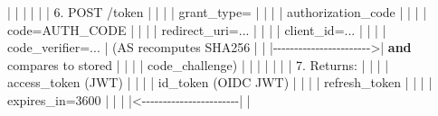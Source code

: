 \documentclass[11pt]{article}
\newenvironment{Shaded}{\begin{snugshade}}{\end{snugshade}}
\newcommand{\DecValTok}[1]{\textcolor[rgb]{0.96,0.45,0.00}{#1}}
\newcommand{\FloatTok}[1]{\textcolor[rgb]{0.96,0.45,0.00}{#1}}
\newcommand{\KeywordTok}[1]{\textcolor[rgb]{0.81,0.81,0.76}{\textbf{#1}}}
\newcommand{\NormalTok}[1]{\textcolor[rgb]{0.81,0.81,0.76}{#1}}
\newcommand{\OperatorTok}[1]{\textcolor[rgb]{0.81,0.81,0.76}{#1}}
\begin{document}
\begin{Shaded}
\begin{Highlighting}[]
  \OperatorTok{|}                \OperatorTok{|}                        \OperatorTok{|}                          \OperatorTok{|}
  \OperatorTok{|}                \OperatorTok{|} \FloatTok{6.}\NormalTok{ POST }\OperatorTok{/}\NormalTok{token         }\OperatorTok{|}                          \OperatorTok{|}
  \OperatorTok{|}                \OperatorTok{|}\NormalTok{    grant\_type}\OperatorTok{=}         \OperatorTok{|}                          \OperatorTok{|}
  \OperatorTok{|}                \OperatorTok{|}\NormalTok{    authorization\_code  }\OperatorTok{|}                          \OperatorTok{|}
  \OperatorTok{|}                \OperatorTok{|}\NormalTok{    code}\OperatorTok{=}\NormalTok{AUTH\_CODE      }\OperatorTok{|}                          \OperatorTok{|}
  \OperatorTok{|}                \OperatorTok{|}\NormalTok{    redirect\_uri}\OperatorTok{=}\NormalTok{...    }\OperatorTok{|}                          \OperatorTok{|}
  \OperatorTok{|}                \OperatorTok{|}\NormalTok{    client\_id}\OperatorTok{=}\NormalTok{...       }\OperatorTok{|}                          \OperatorTok{|}
  \OperatorTok{|}                \OperatorTok{|}\NormalTok{    code\_verifier}\OperatorTok{=}\NormalTok{...   }\OperatorTok{|}\NormalTok{ (AS recomputes SHA256    }\OperatorTok{|}
  \OperatorTok{|}                \OperatorTok{|{-}{-}{-}{-}{-}{-}{-}{-}{-}{-}{-}{-}{-}{-}{-}{-}{-}{-}{-}{-}{-}{-}{-}\textgreater{}|}  \KeywordTok{and}\NormalTok{ compares to stored  }\OperatorTok{|}
  \OperatorTok{|}                \OperatorTok{|}                        \OperatorTok{|}\NormalTok{  code\_challenge)         }\OperatorTok{|}
  \OperatorTok{|}                \OperatorTok{|}                        \OperatorTok{|}                          \OperatorTok{|}
  \OperatorTok{|}                \OperatorTok{|} \FloatTok{7.}\NormalTok{ Returns:            }\OperatorTok{|}                          \OperatorTok{|}
  \OperatorTok{|}                \OperatorTok{|}\NormalTok{    access\_token (JWT)  }\OperatorTok{|}                          \OperatorTok{|}
  \OperatorTok{|}                \OperatorTok{|}\NormalTok{    id\_token (OIDC JWT) }\OperatorTok{|}                          \OperatorTok{|}
  \OperatorTok{|}                \OperatorTok{|}\NormalTok{    refresh\_token       }\OperatorTok{|}                          \OperatorTok{|}
  \OperatorTok{|}                \OperatorTok{|}\NormalTok{    expires\_in}\OperatorTok{=}\DecValTok{3600}     \OperatorTok{|}                          \OperatorTok{|}
  \OperatorTok{|}                \OperatorTok{|\textless{}{-}{-}{-}{-}{-}{-}{-}{-}{-}{-}{-}{-}{-}{-}{-}{-}{-}{-}{-}{-}{-}{-}{-}|}                          \OperatorTok{|}

\end{Highlighting}
\end{Shaded}
\end{document}
